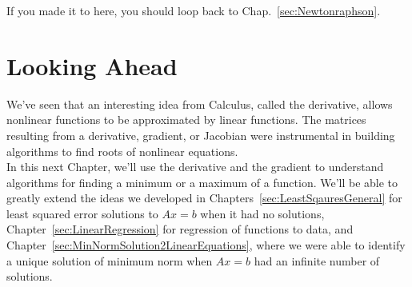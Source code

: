 If you made it to here, you should loop back to Chap.~\ref{sec:Newtonraphson}. 

\section{Looking Ahead}

We've seen that an interesting idea from Calculus, called the derivative, allows nonlinear functions to be approximated by linear functions. The matrices resulting from a derivative, gradient, or Jacobian were instrumental in building algorithms to find roots of nonlinear equations.\\

In this next Chapter, we'll use the derivative and the gradient to understand algorithms for finding a minimum or a maximum of a function. We'll be able to greatly extend the ideas we developed in Chapters~\ref{sec:LeastSqauresGeneral} for least squared error solutions to $Ax=b$ when it had no solutions, Chapter~\ref{sec:LinearRegression} for regression of functions to data, and Chapter~\ref{sec:MinNormSolution2LinearEquations}, where we were able to identify a unique solution of minimum norm when $Ax=b$ had an infinite number of solutions.